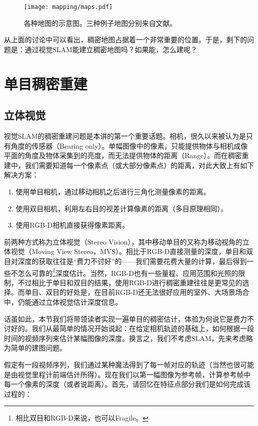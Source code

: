 \begin{figure}[!ht]
	\centering
	\texttt{[image: mapping/maps.pdf]}
	\caption{各种地图的示意图。三种例子地图分别来自文献\cite{Mur-Artal2015, Labbe2014, Salas-Moreno2013}。}
	\label{fig:maps}
\end{figure}

从上面的讨论中可以看出，稠密地图占据着一个非常重要的位置。于是，剩下的问题是：通过视觉SLAM能建立稠密地图吗？如果能，怎么建呢？

\section{单目稠密重建}
\subsection{立体视觉}
视觉SLAM的稠密重建问题是本讲的第一个重要话题。相机，很久以来被认为是只有角度的传感器（Bearing only）。单幅图像中的像素，只能提供物体与相机成像平面的角度及物体采集到的亮度，而无法提供物体的距离（Range）。而在稠密重建中，我们需要知道每一个像素点（或大部分像素点）的距离，对此大致上有如下解决方案：

\begin{enumerate}
	\item 使用单目相机，通过移动相机之后进行三角化测量像素的距离。
	\item 使用双目相机，利用左右目的视差计算像素的距离（多目原理相同）。
	\item 使用RGB-D相机直接获得像素距离。
\end{enumerate}

前两种方式称为立体视觉（Stereo Vision），其中移动单目的又称为移动视角的立体视觉（Moving View Stereo，MVS）。相比于RGB-D直接测量的深度，单目和双目对深度的获取往往是“费力不讨好”的——我们需要花费大量的计算，最后得到一些不怎么可靠的\footnote{相比双目和RGB-D来说，也可以Fragile。}深度估计。当然，RGB-D也有一些量程、应用范围和光照的限制，不过相比于单目和双目的结果，使用RGB-D进行稠密重建往往是更常见的选择。而单目、双目的好处是，在目前RGB-D还无法很好应用的室外、大场景场合中，仍能通过立体视觉估计深度信息。

话虽如此，本节我们将带领读者实现一遍单目的稠密估计，体验为何说它是费力不讨好的。我们从最简单的情况开始说起：在给定相机轨迹的基础上，如何根据一段时间的视频序列来估计某幅图像的深度。换言之，我们不考虑SLAM，先来考虑略为简单的建图问题。

假定有一段视频序列，我们通过某种魔法得到了每一帧对应的轨迹（当然也很可能是由视觉里程计前端估计所得）。现在我们以第一幅图像为参考帧，计算参考帧中每一个像素的深度（或者说距离）。首先，请回忆在特征点部分我们是如何完成该过程的：

